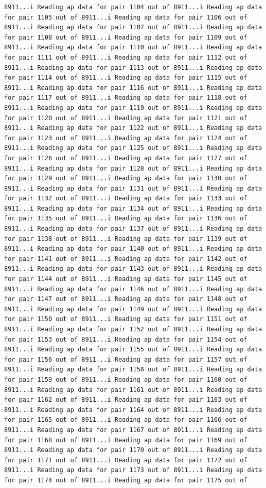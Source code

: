\documentclass[
]{article}
\begin{document}
\begin{verbatim}
8911...i Reading ap data for pair 1104 out of 8911...i Reading ap data for pair 1105 out of 8911...i Reading ap data for pair 1106 out of 8911...i Reading ap data for pair 1107 out of 8911...i Reading ap data for pair 1108 out of 8911...i Reading ap data for pair 1109 out of 8911...i Reading ap data for pair 1110 out of 8911...i Reading ap data for pair 1111 out of 8911...i Reading ap data for pair 1112 out of 8911...i Reading ap data for pair 1113 out of 8911...i Reading ap data for pair 1114 out of 8911...i Reading ap data for pair 1115 out of 8911...i Reading ap data for pair 1116 out of 8911...i Reading ap data for pair 1117 out of 8911...i Reading ap data for pair 1118 out of 8911...i Reading ap data for pair 1119 out of 8911...i Reading ap data for pair 1120 out of 8911...i Reading ap data for pair 1121 out of 8911...i Reading ap data for pair 1122 out of 8911...i Reading ap data for pair 1123 out of 8911...i Reading ap data for pair 1124 out of 8911...i Reading ap data for pair 1125 out of 8911...i Reading ap data for pair 1126 out of 8911...i Reading ap data for pair 1127 out of 8911...i Reading ap data for pair 1128 out of 8911...i Reading ap data for pair 1129 out of 8911...i Reading ap data for pair 1130 out of 8911...i Reading ap data for pair 1131 out of 8911...i Reading ap data for pair 1132 out of 8911...i Reading ap data for pair 1133 out of 8911...i Reading ap data for pair 1134 out of 8911...i Reading ap data for pair 1135 out of 8911...i Reading ap data for pair 1136 out of 8911...i Reading ap data for pair 1137 out of 8911...i Reading ap data for pair 1138 out of 8911...i Reading ap data for pair 1139 out of 8911...i Reading ap data for pair 1140 out of 8911...i Reading ap data for pair 1141 out of 8911...i Reading ap data for pair 1142 out of 8911...i Reading ap data for pair 1143 out of 8911...i Reading ap data for pair 1144 out of 8911...i Reading ap data for pair 1145 out of 8911...i Reading ap data for pair 1146 out of 8911...i Reading ap data for pair 1147 out of 8911...i Reading ap data for pair 1148 out of 8911...i Reading ap data for pair 1149 out of 8911...i Reading ap data for pair 1150 out of 8911...i Reading ap data for pair 1151 out of 8911...i Reading ap data for pair 1152 out of 8911...i Reading ap data for pair 1153 out of 8911...i Reading ap data for pair 1154 out of 8911...i Reading ap data for pair 1155 out of 8911...i Reading ap data for pair 1156 out of 8911...i Reading ap data for pair 1157 out of 8911...i Reading ap data for pair 1158 out of 8911...i Reading ap data for pair 1159 out of 8911...i Reading ap data for pair 1160 out of 8911...i Reading ap data for pair 1161 out of 8911...i Reading ap data for pair 1162 out of 8911...i Reading ap data for pair 1163 out of 8911...i Reading ap data for pair 1164 out of 8911...i Reading ap data for pair 1165 out of 8911...i Reading ap data for pair 1166 out of 8911...i Reading ap data for pair 1167 out of 8911...i Reading ap data for pair 1168 out of 8911...i Reading ap data for pair 1169 out of 8911...i Reading ap data for pair 1170 out of 8911...i Reading ap data for pair 1171 out of 8911...i Reading ap data for pair 1172 out of 8911...i Reading ap data for pair 1173 out of 8911...i Reading ap data for pair 1174 out of 8911...i Reading ap data for pair 1175 out of 
\end{verbatim}
\end{document}
